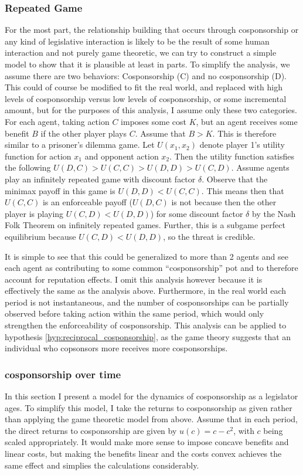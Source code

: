 \documentclass{article}
\begin{document}
\subsubsection{Repeated Game}
For the most part, the relationship building that occurs through cosponsorship or any kind of legislative interaction is likely to be the result of some human interaction and not purely game theoretic, we can try to construct a simple model to show that it is plausible at least in parts. To simplify the analysis, we assume there are two behaviors: Cosponsorship (C) and no cosponsorship (D). This could of course be modified to fit the real world, and replaced with high levels of cosponsorship versus low levels of cosponsorship, or some incremental amount, but for the purposes of this analysis, I assume only these two categories. For each agent, taking action $C$ imposes some cost $K$, but an agent receives some benefit $B$ if the other player plays $C$. Assume that $B > K$. This is therefore similar to a prisoner's dilemma game. Let $U(x_1, x_2)$ denote player 1's utility function for action $x_1$ and opponent action $x_2$. Then the utility function satisfies the following $U(D, C) > U(C, C) > U(D, D) > U(C, D)$. Assume agents play an infinitely repeated game with discount factor $\delta$. Observe that the minimax payoff in this game is $U(D, D) < U(C, C)$. This means then that $U(C, C)$ is an enforceable payoff ($U(D, C)$ is not because then the other player is playing $U(C, D) < U(D, D)$) for some discount factor $\delta$ by the Nash Folk Theorem on infinitely repeated games. Further, this is a subgame perfect equilibrium because $U(C, D) < U(D, D)$, so the threat is credible. 

It is simple to see that this could be generalized to more than 2 agents and see each agent as contributing to some common ``cosponsorship'' pot and to therefore account for reputation effects. I omit this analysis however because it is effectively the same as the analysis above. Furthermore, in the real world each period is not instantaneous, and the number of cosponsorships can be partially observed before taking action within the same period, which would only strengthen the enforceability of cosponsorship. This analysis can be applied to hypothesis \ref{hyp:reciprocal_cosponsorship}, as the game theory suggests that an individual who copsonsors more receives more cosponsorships. 

\subsubsection{cosponsorship over time}
In this section I present a model for the dynamics of cosponsorship as a legislator ages. To simplify this model, I take the returns to cosponsorship as given rather than applying the game theoretic model from above. Assume that in each period, the direct returns to cosponsorship are given by $u(c) = c - c^2$, with $c$ being scaled appropriately. It would make more sense to impose concave benefits and linear costs, but making the benefits linear and the costs convex achieves the same effect and simplies the calculations considerably.
\end{document}
